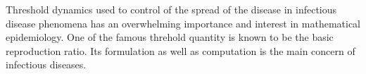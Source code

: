 Threshold dynamics used to control of the spread of the disease in infectious disease phenomena has an overwhelming importance and interest in mathematical epidemiology. One of the famous threhold quantity is known to be the basic reproduction ratio. Its formulation as well as computation is the main concern of infectious diseases.

